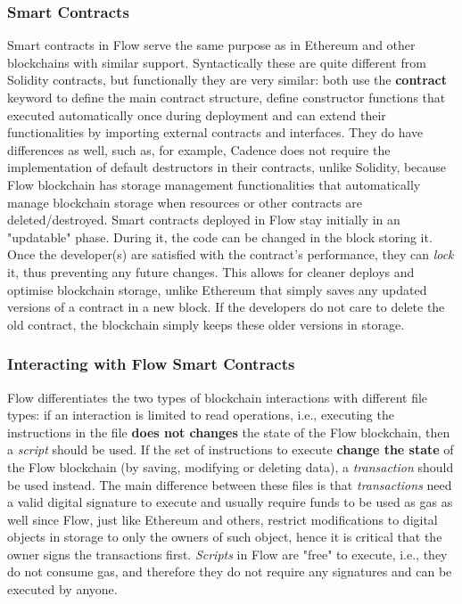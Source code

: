 \documentclass[../access.tex]{subfiles}
\begin{document}
\subsubsection{Smart Contracts}
\label{sec:smart_contracts}
Smart contracts in Flow serve the same purpose as in Ethereum and other blockchains with similar support. Syntactically these are quite different from Solidity contracts, but functionally they are very similar: both use the \textbf{contract} keyword to define the main contract structure, define constructor functions that executed automatically once during deployment and can extend their functionalities by importing external contracts and interfaces. They do have differences as well, such as, for example, Cadence does not require the implementation of default destructors in their contracts, unlike Solidity, because Flow blockchain has storage management functionalities that automatically manage blockchain storage when resources or other contracts are deleted/destroyed. Smart contracts deployed in Flow stay initially in an "updatable" phase. During it, the code can be changed in the block storing it. Once the developer(s) are satisfied with the contract's performance, they can \textit{lock} it, thus preventing any future changes. This allows for cleaner deploys and optimise blockchain storage, unlike Ethereum that simply saves any updated versions of a contract in a new block. If the developers do not care to delete the old contract, the blockchain simply keeps these older versions in storage.

\subsubsection{Interacting with Flow Smart Contracts}
Flow differentiates the two types of blockchain interactions with different file types: if an interaction is limited to read operations, i.e., executing the instructions in the file \textbf{does not changes} the state of the Flow blockchain, then a \textit{script} should be used. If the set of instructions to execute \textbf{change the state} of the Flow blockchain (by saving, modifying or deleting data), a \textit{transaction} should be used instead. The main difference between these files is that \textit{transactions} need a valid digital signature to execute and usually require funds to be used as gas as well since Flow, just like Ethereum and others, restrict modifications to digital objects in storage to only the owners of such object, hence it is critical that the owner signs the transactions first. \textit{Scripts} in Flow are "free" to execute, i.e., they do not consume gas, and therefore they do not require any signatures and can be executed by anyone.
\end{document}
